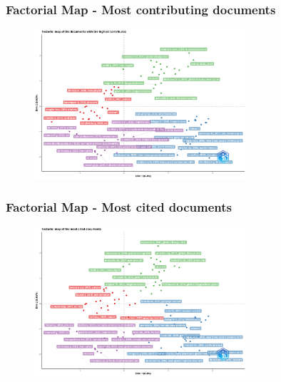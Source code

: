 \documentclass[aspectratio=169]{beamer}
\begin{document}

\begin{frame}
	\frametitle{Factorial Map - Most contributing documents}
	\begin{figure}
		\centering
		\includegraphics[width=0.7\textwidth]{figures/con_stru_map_contrib.png}
	\end{figure}
\end{frame}

\begin{frame}
	\frametitle{Factorial Map - Most cited documents}
	\begin{figure}
		\centering
		\includegraphics[width=0.7\textwidth]{figures/con_stru_map_cited.png}
	\end{figure}
\end{frame}
\end{document}
